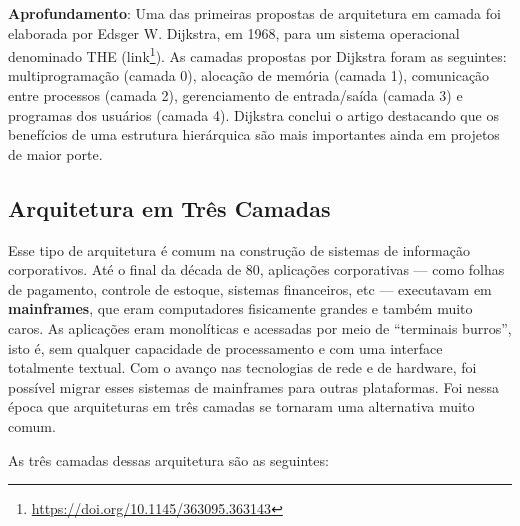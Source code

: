 \documentclass[
  11pt,
  twoside]{book}
\DeclareRobustCommand{\href}[2]{#2\footnote{\url{#1}}}
\newenvironment{esmbox}{\centering \vspace{1.5ex} \begin{tcolorbox}[breakable, colback=backcolor, width=4.9in]}{\end{tcolorbox} \vspace{1.5ex}}
\begin{document}
 

\begin{esmbox}

\textbf{Aprofundamento}: Uma das primeiras propostas de arquitetura em
camada foi elaborada por Edsger W. Dijkstra, em 1968, para um sistema
operacional denominado THE
(\href{https://doi.org/10.1145/363095.363143}{link}). As camadas
propostas por Dijkstra foram as seguintes: multiprogramação (camada 0),
alocação de memória (camada 1), comunicação entre processos (camada 2),
gerenciamento de entrada/saída (camada 3) e programas dos usuários
(camada 4). Dijkstra conclui o artigo destacando que os benefícios de
uma estrutura hierárquica são mais importantes ainda em projetos de
maior porte.

\end{esmbox}

\hypertarget{arquitetura-em-truxeas-camadas}{%
\subsection{Arquitetura em Três
Camadas}\label{arquitetura-em-truxeas-camadas}}


 Esse tipo de arquitetura é comum na construção de
sistemas de informação corporativos. Até o final da década de 80,
aplicações corporativas --- como folhas de pagamento, controle de
estoque, sistemas financeiros, etc --- executavam em
\textbf{mainframes}, que eram computadores fisicamente grandes e também
muito caros. As aplicações eram monolíticas e acessadas por meio de
``terminais burros'', isto é, sem qualquer capacidade de processamento e
com uma interface totalmente textual. Com o avanço nas tecnologias de
rede e de hardware, foi possível migrar esses sistemas de mainframes
para outras plataformas. Foi nessa época que arquiteturas em três
camadas se tornaram uma alternativa muito comum.

As três camadas dessas arquitetura são as seguintes:
\end{document}
